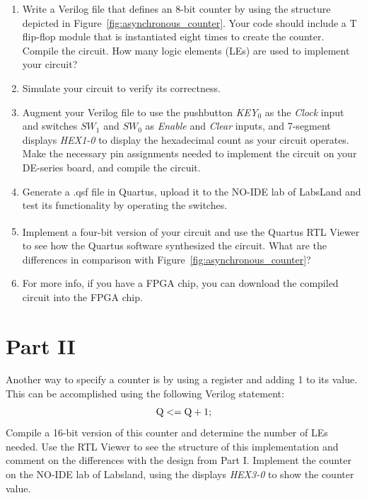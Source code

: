 \documentclass[epsfig,10pt,fullpage]{article}
\begin{document}
\begin{enumerate}
\item Write a Verilog file that defines an 8-bit counter by using the structure
depicted in Figure~\ref{fig:asynchronous_counter}. Your code should include a T 
flip-flop module that is instantiated
eight times to create the counter. Compile the circuit. How many logic elements (LEs) are 
used to implement your circuit? 
\item Simulate your circuit to verify its correctness.
\item Augment your Verilog file to use the pushbutton {\it KEY}$_0$ as the {\it Clock}
input and switches $SW_1$ and $SW_0$ as {\it Enable} and {\it Clear} inputs, and
7-segment displays {\it HEX1-0} to display the hexadecimal count as your circuit
operates. Make the necessary pin assignments needed to implement the circuit on your
DE-series board, and compile the circuit.
\item Generate a .qsf file in Quartus, upload it to the NO-IDE lab of LabsLand and test its functionality by operating
the switches.
\item Implement a four-bit version of your circuit and use the Quartus\textsuperscript{\textregistered} RTL Viewer to
see how the Quartus software synthesized the circuit. What are the differences in
comparison with Figure~\ref{fig:asynchronous_counter}?
\item For more info, if you have a FPGA chip, you can download the compiled circuit into the FPGA chip.
\end{enumerate}

\section*{Part II}
Another way to specify a counter is by using a register and adding 1 to its value. 
This can be accomplished using the following Verilog statement:
$$
{\rm Q <= Q + 1;}
$$
\noindent
Compile a 16-bit version of this counter and determine the number of LEs needed.  Use the RTL 
Viewer to see the structure of this implementation and comment on the differences with the 
design from Part I. Implement the counter on the NO-IDE lab of Labsland, using the displays 
{\it HEX3-0} to show the counter value.
\end{document}
